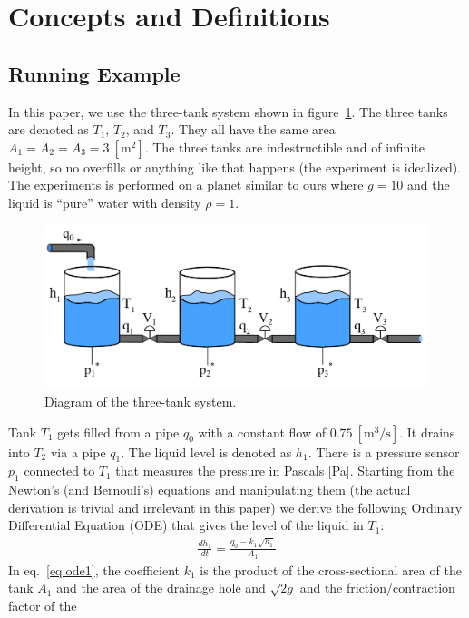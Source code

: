 \section{Concepts and Definitions}
%
\label{sec:concepts}
%
\subsection{Running Example}
%
In this paper, we use the three-tank system shown in
figure~\ref{fig:three_tanks}. The three tanks are denoted as $T_1$,
$T_2$, and $T_3$. They all have the same area $A_1 = A_2 = A_3 =
3~[\textrm{m}^2]$. The three tanks are indestructible and of infinite
height, so no overfills or anything like that happens (the experiment
is idealized). The experiments is performed on a planet similar to
ours where $g = 10$ and the liquid is ``pure'' water with density
$\rho = 1$.
%
\begin{figure}[htb]
  \centering
  \includegraphics[width=1\columnwidth]{3-tanks}
  \caption{Diagram of the three-tank system.}
  \label{fig:three_tanks}
\end{figure}
\par\noindent
%
Tank $T_1$ gets filled from a pipe $q_0$ with a constant flow of
$0.75~[\textrm{m}^3/\textrm{s}]$. It drains into $T_2$ via a pipe
$q_1$. The liquid level is denoted as $h_1$. There is a pressure
sensor $p_1$ connected to $T_1$ that measures the pressure in Pascals
[Pa]. Starting from the Newton's (and Bernouli's) equations and
manipulating them (the actual derivation is trivial and irrelevant in
this paper) we derive the following Ordinary Differential Equation
(ODE) that gives the level of the liquid in $T_1$:
%
\begin{eqnarray}
%
\frac{d h_1}{dt} = \frac{q_0 - k_1 \sqrt{h_1}}{A_1}\label{eq:ode1}
%
\end{eqnarray}
%
In eq.~\ref{eq:ode1}, the coefficient $k_1$ is the product of the
cross-sectional area of the tank $A_1$ and the area of the drainage
hole and $\sqrt{2g}$ and the friction/contraction factor of the
